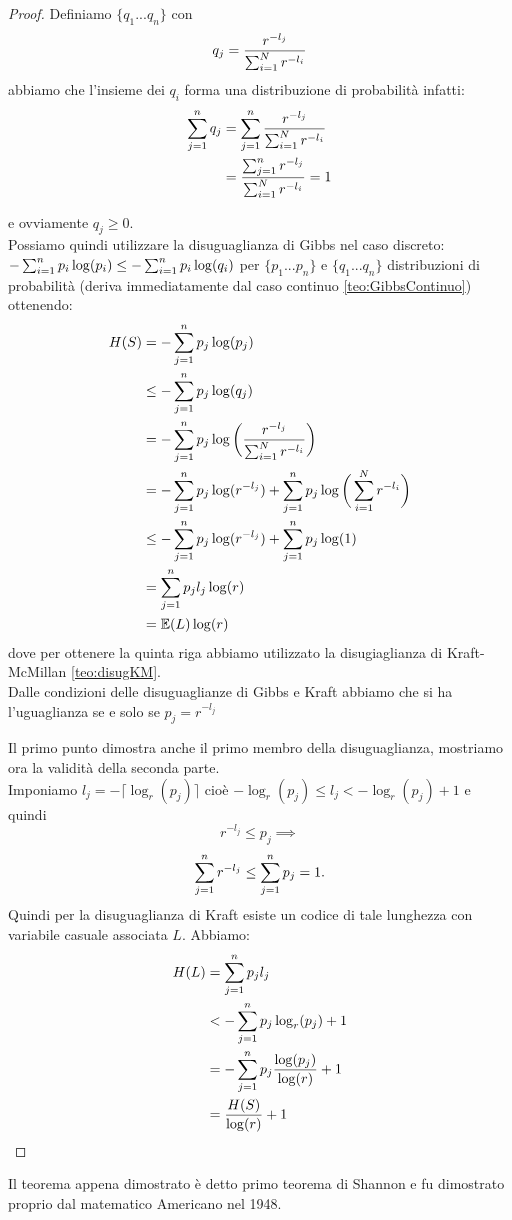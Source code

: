 \begin{proof}
\item Definiamo $\{q_1...q_n \}$ con
\begin{equation}
q_j=\frac{r^{-l_j}}{\sum_{i=1}^N r^{-l_i}}
\end{equation}
abbiamo che l'insieme dei $q_i$ forma una distribuzione di probabilità infatti:
\[
\begin{split}
\sum_{j=1}^n q_j& = \sum_{j=1}^n \frac{r^{-l_j}}{\sum_{i=1}^N r^{-l_i}}\\
&= \frac{\sum_{j=1}^n  r^{-l_j}}{\sum_{i=1}^N r^{-l_i}} =1
\end{split}
\]

e ovviamente $q_j\geq 0$.\\
Possiamo quindi utilizzare la disuguaglianza di Gibbs nel caso discreto: $- \sum_{i=1}^n p_i \log(p_i) \leq - \sum_{i=1}^n p_i \log(q_i)$ per $\{p_1...p_n \}$ e $\{q_1...q_n \}$ distribuzioni di probabilità (deriva immediatamente dal caso continuo \ref{teo:GibbsContinuo}) ottenendo:
\[
\begin{split}
H(S)& = - \sum_{j=1}^n p_j \log(p_j) \\
& \leq  - \sum_{j=1}^n p_j \log(q_j)\\
& =  - \sum_{j=1}^n p_j \log \bigg(\frac{r^{-l_j}}{\sum_{i=1}^N r^{-l_i}} \bigg)\\
& =  - \sum_{j=1}^n p_j \log ( r^{-l_j}) +\sum_{j=1}^n p_j \log \bigg( \sum_{i=1}^N r^{-l_i} \bigg)\\
& \leq - \sum_{j=1}^n p_j \log ( r^{-l_j}) +\sum_{j=1}^n p_j \log (1)\\
& =\sum_{j=1}^n p_j l_j \log ( r)\\
&= \mathbb{E}(L)\log (r)
\end{split}
\]
dove per ottenere la quinta riga abbiamo utilizzato la disugiaglianza di Kraft-McMillan \ref{teo:disugKM}.\\
Dalle condizioni delle disuguaglianze di Gibbs e Kraft abbiamo che si ha l'uguaglianza se e solo se $p_j=r^{-l_j}$
\item  Il primo punto dimostra anche il primo membro della disuguaglianza, mostriamo ora la validità della seconda parte.\\
Imponiamo $l_j =  -\lceil \log_r(p_j) \rceil$ cioè  $- \log_r(p_j) \leq l_j < - \log_r(p_j) +1$ e quindi 
$$r^{-l_j} \leq p_j \implies $$ 
$$  \sum_{j=1}^n r^{-l_j} \leq \sum_{j=1}^n p_j=1.$$
Quindi per la disuguaglianza di Kraft esiste un codice di tale lunghezza con variabile casuale associata $L$. Abbiamo:
\[
\begin{split}
H(L)& =  \sum_{j=1}^n p_j l_j \\
& <   - \sum_{j=1}^n p_j  \log_r(p_j) +1\\
& = - \sum_{j=1}^n p_j  \frac{\log(p_j)}{\log(r)} +1 \\
& =  \frac{H(S)}{ \log (r)} +1
\end{split}
\]
\end{proof}
Il teorema appena dimostrato è detto primo teorema di Shannon e fu dimostrato proprio dal matematico Americano nel 1948.\\

